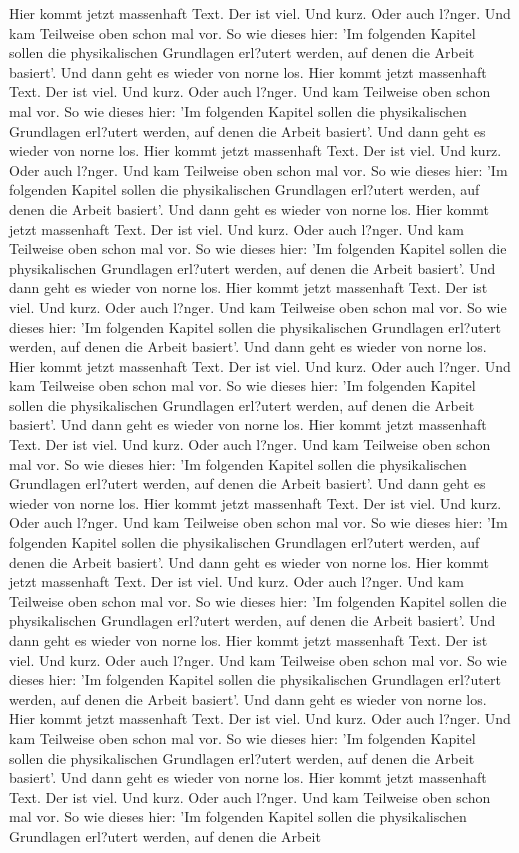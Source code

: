 Hier kommt jetzt massenhaft Text. Der ist viel. Und kurz. Oder auch l?nger. Und kam Teilweise oben schon mal vor. So wie dieses hier: 'Im folgenden Kapitel sollen die physikalischen Grundlagen erl?utert werden, auf denen die Arbeit basiert'.  Und dann geht es wieder von norne los. Hier kommt jetzt massenhaft Text. Der ist viel. Und kurz. Oder auch l?nger. Und kam Teilweise oben schon mal vor. So wie dieses hier: 'Im folgenden Kapitel sollen die physikalischen Grundlagen erl?utert werden, auf denen die Arbeit basiert'.  Und dann geht es wieder von norne los. Hier kommt jetzt massenhaft Text. Der ist viel. Und kurz. Oder auch l?nger. Und kam Teilweise oben schon mal vor. So wie dieses hier: 'Im folgenden Kapitel sollen die physikalischen Grundlagen erl?utert werden, auf denen die Arbeit basiert'.  Und dann geht es wieder von norne los. Hier kommt jetzt massenhaft Text. Der ist viel. Und kurz. Oder auch l?nger. Und kam Teilweise oben schon mal vor. So wie dieses hier: 'Im folgenden Kapitel sollen die physikalischen Grundlagen erl?utert werden, auf denen die Arbeit basiert'.  Und dann geht es wieder von norne los. Hier kommt jetzt massenhaft Text. Der ist viel. Und kurz. Oder auch l?nger. Und kam Teilweise oben schon mal vor. So wie dieses hier: 'Im folgenden Kapitel sollen die physikalischen Grundlagen erl?utert werden, auf denen die Arbeit basiert'.  Und dann geht es wieder von norne los. Hier kommt jetzt massenhaft Text. Der ist viel. Und kurz. Oder auch l?nger. Und kam Teilweise oben schon mal vor. So wie dieses hier: 'Im folgenden Kapitel sollen die physikalischen Grundlagen erl?utert werden, auf denen die Arbeit basiert'.  Und dann geht es wieder von norne los. Hier kommt jetzt massenhaft Text. Der ist viel. Und kurz. Oder auch l?nger. Und kam Teilweise oben schon mal vor. So wie dieses hier: 'Im folgenden Kapitel sollen die physikalischen Grundlagen erl?utert werden, auf denen die Arbeit basiert'.  Und dann geht es wieder von norne los. Hier kommt jetzt massenhaft Text. Der ist viel. Und kurz. Oder auch l?nger. Und kam Teilweise oben schon mal vor. So wie dieses hier: 'Im folgenden Kapitel sollen die physikalischen Grundlagen erl?utert werden, auf denen die Arbeit basiert'.  Und dann geht es wieder von norne los. Hier kommt jetzt massenhaft Text. Der ist viel. Und kurz. Oder auch l?nger. Und kam Teilweise oben schon mal vor. So wie dieses hier: 'Im folgenden Kapitel sollen die physikalischen Grundlagen erl?utert werden, auf denen die Arbeit basiert'.  Und dann geht es wieder von norne los. Hier kommt jetzt massenhaft Text. Der ist viel. Und kurz. Oder auch l?nger. Und kam Teilweise oben schon mal vor. So wie dieses hier: 'Im folgenden Kapitel sollen die physikalischen Grundlagen erl?utert werden, auf denen die Arbeit basiert'.  Und dann geht es wieder von norne los. Hier kommt jetzt massenhaft Text. Der ist viel. Und kurz. Oder auch l?nger. Und kam Teilweise oben schon mal vor. So wie dieses hier: 'Im folgenden Kapitel sollen die physikalischen Grundlagen erl?utert werden, auf denen die Arbeit basiert'.  Und dann geht es wieder von norne los. Hier kommt jetzt massenhaft Text. Der ist viel. Und kurz. Oder auch l?nger. Und kam Teilweise oben schon mal vor. So wie dieses hier: 'Im folgenden Kapitel sollen die physikalischen Grundlagen erl?utert werden, auf denen die Arbeit 